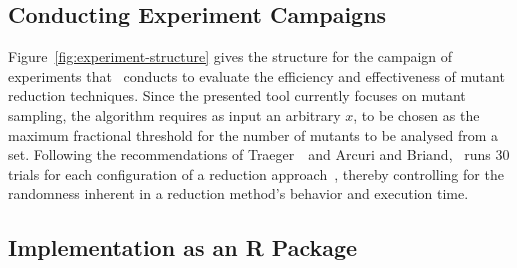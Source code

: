 \subsection{Conducting Experiment Campaigns}





Figure~\ref{fig:experiment-structure} gives the structure for the campaign of experiments that \mr~conducts to evaluate
the efficiency and effectiveness of mutant reduction techniques. Since the presented tool currently focuses on mutant
sampling, the algorithm requires as input an arbitrary $x$, to be chosen as the maximum fractional threshold for the
number of mutants to be analysed from a set.  Following the recommendations of Traeger~\etal~and Arcuri and Briand,
\mr~runs 30 trials for each configuration of a reduction approach~\cite{traeger2008nine, arcuri2014hitchhiker}, thereby
controlling for the randomness inherent in a reduction method's behavior and execution time.

\subsection{Implementation as an R Package}

